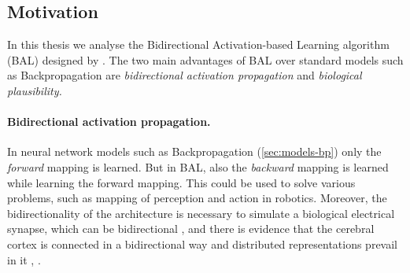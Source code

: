 




\subsection*{Motivation}
\label{sec:motivation} 
In this thesis we analyse the Bidirectional Activation-based Learning algorithm (BAL) designed by \citet{farkas2013bal}. The two main advantages of BAL over standard models such as Backpropagation are \emph{bidirectional activation propagation} and \emph{biological plausibility.}

\paragraph{Bidirectional activation propagation.} In neural network models such as Backpropagation (\ref{sec:models-bp}) only the \emph{forward} mapping is learned. But in BAL, also the \emph{backward} mapping is learned while learning the forward mapping. This could be used to solve various problems, such as mapping of perception and action in robotics. Moreover, the bidirectionality of the architecture is necessary to simulate a biological electrical synapse, which can be bidirectional \citep{kandel1995essentials}, \citep{rosa2002biologically} and there is evidence that the cerebral cortex is connected in a bidirectional way and distributed representations prevail in it \citep{o2000computational}, \citep{da2011advances}. 

